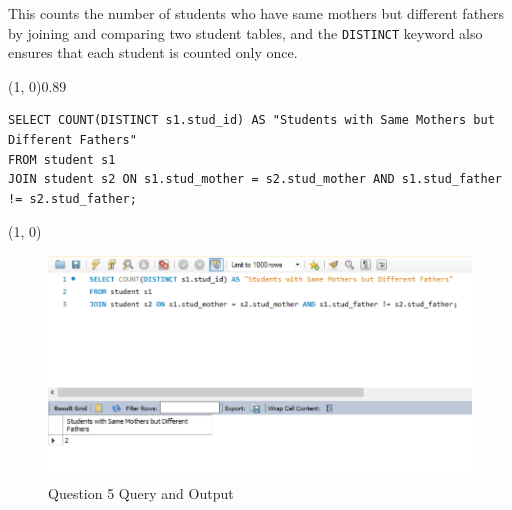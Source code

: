 
This counts the number of students who have same mothers but different fathers by joining and comparing two student tables, and the \texttt{DISTINCT} keyword also ensures that each student is counted only once.
\vspace{\baselineskip}

\sol{}
\noindent\line(1, 0){0.89\linewidth}
\begin{verbatim}
SELECT COUNT(DISTINCT s1.stud_id) AS "Students with Same Mothers but Different Fathers" 
FROM student s1
JOIN student s2 ON s1.stud_mother = s2.stud_mother AND s1.stud_father != s2.stud_father;
\end{verbatim}
\noindent\line(1, 0){\linewidth}

\begin{figure}[H]
    \centering
    \includegraphics[width=0.7\linewidth]{images/q5.png}
    \caption{Question 5 Query and Output}
\end{figure}
